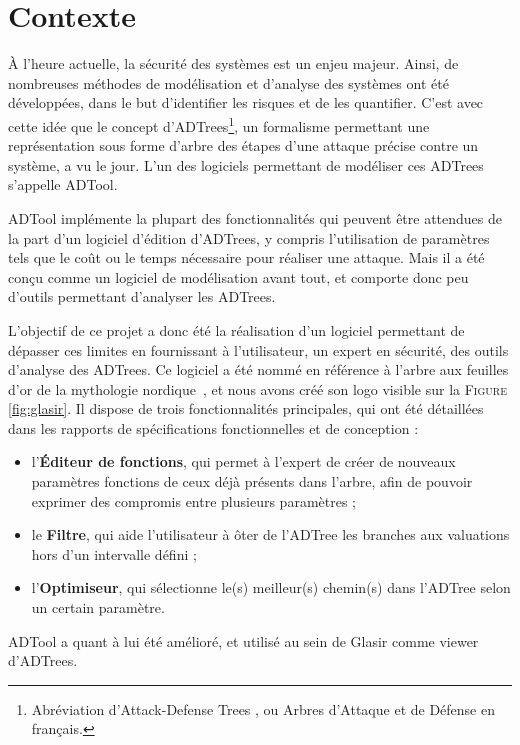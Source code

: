 \section{Contexte}
\label{Contexte}

    À l'heure actuelle, la sécurité des systèmes est un enjeu majeur. Ainsi, de nombreuses méthodes de modélisation et d'analyse des systèmes ont été développées, dans le but d'identifier les risques et de les quantifier. C'est avec cette idée que le concept d'ADTrees\footnote{Abréviation d'\og Attack-Defense Trees \fg{}, ou \og Arbres d'Attaque et de Défense\fg{} en français.}, un formalisme permettant une représentation sous forme d'arbre des étapes d'une attaque précise contre un système, a vu le jour. L'un des logiciels permettant de modéliser ces ADTrees s'appelle ADTool.

    ADTool implémente la plupart des fonctionnalités qui peuvent être attendues de la part d'un logiciel d'édition d'ADTrees, y compris l'utilisation de paramètres tels que le coût ou le temps nécessaire pour réaliser une attaque. Mais il a été conçu comme un logiciel de modélisation avant tout, et comporte donc peu d'outils permettant d'analyser les ADTrees. 

    L'objectif de ce projet a donc été la réalisation d'un logiciel permettant de dépasser ces limites en fournissant à l'utilisateur, un expert en sécurité, des outils d'analyse des ADTrees. Ce logiciel a été nommé \glasir{} en référence à l'arbre aux feuilles d'or de la mythologie nordique~\cite{vikingCulture}, et nous avons créé son logo visible sur la \textsc{Figure} \ref{fig:glasir}. Il dispose de trois fonctionnalités principales, qui ont été détaillées dans les rapports de spécifications fonctionnelles et de conception :    
\begin{itemize}
    	\item l'{\bf Éditeur de fonctions}, qui permet à l'expert de créer de nouveaux paramètres fonctions de ceux déjà présents dans l'arbre, afin de pouvoir exprimer des compromis entre plusieurs paramètres ;
    	\item le {\bf Filtre}, qui aide l'utilisateur à ôter de l'ADTree les branches aux valuations hors d'un intervalle défini ;
    	\item l'{\bf Optimiseur}, qui sélectionne le(s) meilleur(s) chemin(s) dans l'ADTree selon un certain paramètre.
\end{itemize} 
ADTool a quant à lui été amélioré, et utilisé au sein de Glasir comme viewer d'ADTrees. 

